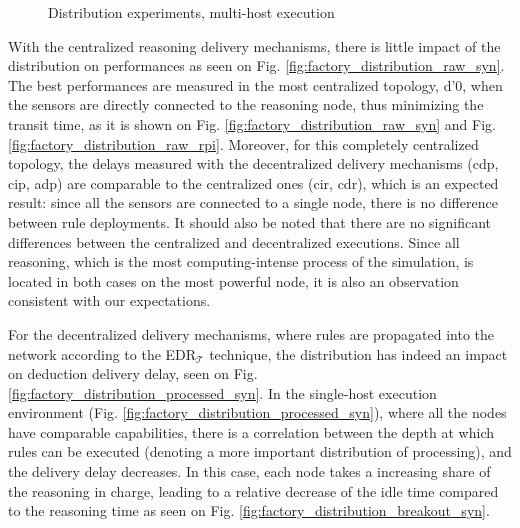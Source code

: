 \documentclass{iosart2c}
\newcommand{\edrt}{EDR$_{\mathcal{T}}$\xspace}
\begin{document}
\begin{figure}
	\Centering
	\caption{\Centering Distribution experiments, multi-host execution}
	\label{fig:factory_distribution_multi-host}
	
	\begin{minipage}{0.395\textwidth}
		\Centering
		\label{fig:factory_distribution_raw_rpi}
		\scalebox{0.8}{
			
		}
	\end{minipage}
	\begin{minipage}{0.595\textwidth}
		\Centering
		\label{fig:factory_distribution_processed_rpi}
		\scalebox{0.8}{
			
		}
	\end{minipage}
\end{figure}

With the centralized reasoning delivery mechanisms, there is little impact of the distribution on performances as seen on Fig. \ref{fig:factory_distribution_raw_syn}.
The best performances are measured in the most centralized topology, d'0, when the sensors are directly connected to the reasoning node, thus minimizing the transit time, as it is shown on Fig. \ref{fig:factory_distribution_raw_syn} and Fig. \ref{fig:factory_distribution_raw_rpi}.
Moreover, for this completely centralized topology, the delays measured with the decentralized delivery mechanisms (\gls{cdp}, \gls{cip}, \gls{adp}) are comparable to the centralized ones (\gls{cir}, \gls{cdr}), which is an expected result: since all the sensors are connected to a single node, there is no difference between rule deployments.
It should also be noted that there are no significant differences between the centralized and decentralized executions.
Since all reasoning, which is the most computing-intense process of the simulation, is located in both cases on the most powerful node, it is also an observation consistent with our expectations.

For the decentralized delivery mechanisms, where rules are propagated into the network according to the \edrt technique, the distribution has indeed an impact on deduction delivery delay, seen on Fig. \ref{fig:factory_distribution_processed_syn}.
In the single-host execution environment (Fig. \ref{fig:factory_distribution_processed_syn}), where all the nodes have comparable capabilities, there is a correlation between the depth at which rules can be executed (denoting a more important distribution of processing), and the delivery delay decreases.
In this case, each node takes a increasing share of the reasoning in charge, leading to a relative decrease of the idle time compared to the reasoning time as seen on Fig. \ref{fig:factory_distribution_breakout_syn}.
\end{document}
